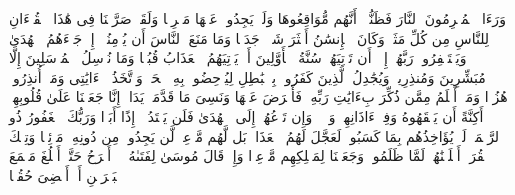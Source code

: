 \stopbuffer%
\startbuffer[\q:18:53]
وَرَءَا ٱلۡمُجۡرِمُونَ ٱلنَّارَ فَظَنُّوۤا۟ أَنَّهُم مُّوَاقِعُوهَا وَلَمۡ یَجِدُوا۟ عَنۡهَا مَصۡرِفࣰا%
\stopbuffer%
\startbuffer[\q:18:54]
وَلَقَدۡ صَرَّفۡنَا فِی هَٰذَا ٱلۡقُرۡءَانِ لِلنَّاسِ مِن كُلِّ مَثَلࣲۚ وَكَانَ ٱلۡإِنسَٰنُ أَكۡثَرَ شَیۡءࣲ جَدَلࣰا%
\stopbuffer%
\startbuffer[\q:18:55]
وَمَا مَنَعَ ٱلنَّاسَ أَن یُؤۡمِنُوۤا۟ إِذۡ جَاۤءَهُمُ ٱلۡهُدَىٰ وَیَسۡتَغۡفِرُوا۟ رَبَّهُمۡ إِلَّاۤ أَن تَأۡتِیَهُمۡ سُنَّةُ ٱلۡأَوَّلِینَ أَوۡ یَأۡتِیَهُمُ ٱلۡعَذَابُ قُبُلࣰا%
\stopbuffer%
\startbuffer[\q:18:56]
وَمَا نُرۡسِلُ ٱلۡمُرۡسَلِینَ إِلَّا مُبَشِّرِینَ وَمُنذِرِینَۚ وَیُجَٰدِلُ ٱلَّذِینَ كَفَرُوا۟ بِٱلۡبَٰطِلِ لِیُدۡحِضُوا۟ بِهِ ٱلۡحَقَّۖ وَٱتَّخَذُوۤا۟ ءَایَٰتِی وَمَاۤ أُنذِرُوا۟ هُزُوࣰا%
\stopbuffer%
\startbuffer[\q:18:57]
وَمَنۡ أَظۡلَمُ مِمَّن ذُكِّرَ بِءَایَٰتِ رَبِّهِۦ فَأَعۡرَضَ عَنۡهَا وَنَسِیَ مَا قَدَّمَتۡ یَدَاهُۚ إِنَّا جَعَلۡنَا عَلَىٰ قُلُوبِهِمۡ أَكِنَّةً أَن یَفۡقَهُوهُ وَفِیۤ ءَاذَانِهِمۡ وَقۡرࣰاۖ وَإِن تَدۡعُهُمۡ إِلَى ٱلۡهُدَىٰ فَلَن یَهۡتَدُوۤا۟ إِذًا أَبَدࣰا%
\stopbuffer%
\startbuffer[\q:18:58]
وَرَبُّكَ ٱلۡغَفُورُ ذُو ٱلرَّحۡمَةِۖ لَوۡ یُؤَاخِذُهُم بِمَا كَسَبُوا۟ لَعَجَّلَ لَهُمُ ٱلۡعَذَابَۚ بَل لَّهُم مَّوۡعِدࣱ لَّن یَجِدُوا۟ مِن دُونِهِۦ مَوۡئِلࣰا%
\stopbuffer%
\startbuffer[\q:18:59]
وَتِلۡكَ ٱلۡقُرَىٰۤ أَهۡلَكۡنَٰهُمۡ لَمَّا ظَلَمُوا۟ وَجَعَلۡنَا لِمَهۡلِكِهِم مَّوۡعِدࣰا%
\stopbuffer%
\startbuffer[\q:18:60]
وَإِذۡ قَالَ مُوسَىٰ لِفَتَىٰهُ لَاۤ أَبۡرَحُ حَتَّىٰۤ أَبۡلُغَ مَجۡمَعَ ٱلۡبَحۡرَیۡنِ أَوۡ أَمۡضِیَ حُقُبࣰا%
\stopbuffer%
